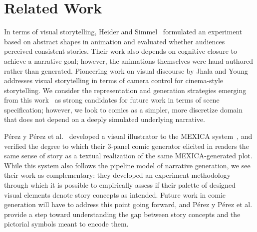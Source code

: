 \section{Related Work}

In terms of visual storytelling,
Heider and Simmel~\cite{heider1944experimental} formulated an experiment
based on abstract shapes in animation and evaluated whether audiences
perceived consistent stories. Their work also depends on cognitive closure
to achieve a narrative goal; however, the animations themselves were
hand-authored rather than generated.
Pioneering work on visual discourse by Jhala and
Young~\cite{jhala2005discourse} addresses visual storytelling in terms of camera
control for cinema-style storytelling. We consider the representation
and generation strategies emerging from this work~\cite{jhala2010cinematic}
as strong candidates for future work in terms of scene specification;
however, we look to comics as a simpler, more discretize domain that does
not depend on a deeply simulated underlying narrative.

P\'erez y P\'erez et al.~\cite{perezyperez2012illustrating} developed a 
visual illustrator to the MEXICA system~\cite{perez2001mexica}, and verified
%
the degree to which their 3-panel comic generator 
elicited in readers the same sense of story as a textual realization of 
the same MEXICA-generated plot. 
%
While this system also follows the pipeline model of narrative generation,
we see their work as complementary: they developed an experiment
methodology through which it is possible to empirically assess if their
palette of designed visual elements denote story concepts as intended.
Future work in comic generation will have to address this point going
forward, and P\'erez y P\'erez et al. provide a step toward understanding
the gap between story concepts and the pictorial symbols meant to encode
them. 





